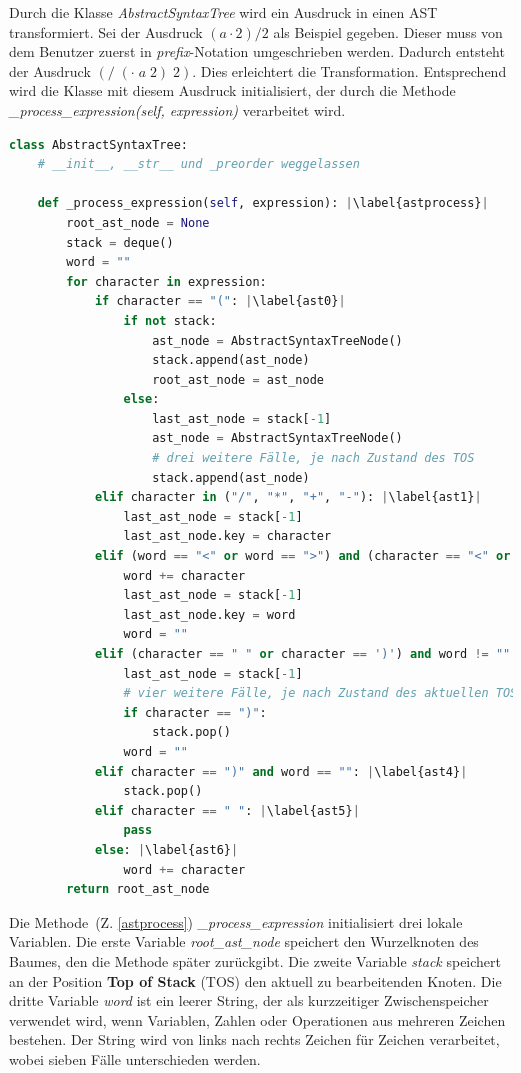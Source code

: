 Durch die Klasse \textit{AbstractSyntaxTree} wird ein Ausdruck in einen AST transformiert. Sei der Ausdruck $(a \cdot 2) / 2$ als Beispiel gegeben.
Dieser muss von dem Benutzer zuerst in \textit{prefix}-Notation umgeschrieben werden. Dadurch entsteht der Ausdruck $(/\; (\cdot \;a \;2) \;2)$. Dies erleichtert die Transformation.
Entsprechend wird die Klasse mit diesem Ausdruck initialisiert, der durch die Methode \textit{\_process\_expression(self, expression)} verarbeitet wird.
\newpage

\begin{lstlisting}[language=Python, escapechar=|, caption=Auszug aus der Klasse \textit{AbstractSyntaxTree}, label={lst:ast}]
class AbstractSyntaxTree:
    # __init__, __str__ und _preorder weggelassen 

    def _process_expression(self, expression): |\label{astprocess}|
        root_ast_node = None
        stack = deque()
        word = ""
        for character in expression:
            if character == "(": |\label{ast0}|
                if not stack:
                    ast_node = AbstractSyntaxTreeNode()
                    stack.append(ast_node)
                    root_ast_node = ast_node
                else:
                    last_ast_node = stack[-1]
                    ast_node = AbstractSyntaxTreeNode()
                    # drei weitere Fälle, je nach Zustand des TOS
                    stack.append(ast_node)
            elif character in ("/", "*", "+", "-"): |\label{ast1}|
                last_ast_node = stack[-1]
                last_ast_node.key = character
            elif (word == "<" or word == ">") and (character == "<" or character == ">"): |\label{ast2}|
                word += character
                last_ast_node = stack[-1]
                last_ast_node.key = word
                word = ""
            elif (character == " " or character == ')') and word != "": |\label{ast3}|
                last_ast_node = stack[-1]
                # vier weitere Fälle, je nach Zustand des aktuellen TOS
                if character == ")":
                    stack.pop()
                word = ""
            elif character == ")" and word == "": |\label{ast4}|
                stack.pop()
            elif character == " ": |\label{ast5}|
                pass
            else: |\label{ast6}|
                word += character
        return root_ast_node
\end{lstlisting}

Die Methode~(Z. \ref{astprocess}) \textit{\_process\_expression} initialisiert drei lokale Variablen.
Die erste Variable \textit{root\_ast\_node} speichert den Wurzelknoten des Baumes, den die Methode später zurückgibt.
Die zweite Variable \textit{stack} speichert an der 
Position \textbf{Top of Stack} (TOS) den aktuell zu bearbeitenden Knoten. Die dritte Variable \textit{word} ist ein leerer String, der als kurzzeitiger Zwischenspeicher verwendet wird,
wenn Variablen, Zahlen oder Operationen aus mehreren Zeichen bestehen.
Der String wird von links nach rechts Zeichen für Zeichen verarbeitet, wobei sieben Fälle unterschieden werden.

